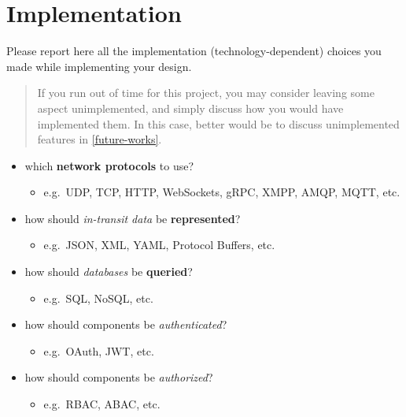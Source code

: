 \documentclass{scrartcl}
\begin{document}
\section{Implementation}\label{implementation}

Please report here all the implementation (technology-dependent) choices you made while implementing your design.

\begin{quote}
  If you run out of time for this project, you may consider leaving some aspect unimplemented, 
  and simply discuss how you would have implemented them.
  In this case, better would be to discuss unimplemented features in \cref{future-works}.
\end{quote}

\begin{itemize}
  \item which \textbf{network protocols} to use?
  \begin{itemize}
    \item e.g.~UDP, TCP, HTTP, WebSockets, gRPC, XMPP, AMQP, MQTT, etc.
  \end{itemize}
  
  \item how should \emph{in-transit data} be \textbf{represented}?
  \begin{itemize}
    \item e.g.~JSON, XML, YAML, Protocol Buffers, etc.
  \end{itemize}
  
  \item how should \emph{databases} be \textbf{queried}?
  \begin{itemize}
    \item e.g.~SQL, NoSQL, etc.
  \end{itemize}
  
  \item how should components be \emph{authenticated}?
  \begin{itemize}
    \item e.g.~OAuth, JWT, etc.
  \end{itemize}

  \item how should components be \emph{authorized}?
  \begin{itemize}
    \item e.g.~RBAC, ABAC, etc.
  \end{itemize}
\end{itemize}
\end{document}
